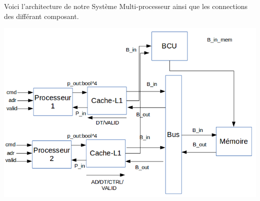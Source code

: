 \documentclass{article}
\begin{document}
\newpage
Voici l'architecture de notre Système Multi-processeur ainsi que les connections des différant composant.\\
\begin{center}
\includegraphics[scale=0.5]{multi.png} 
\end{center}

\newpage
\end{document}
